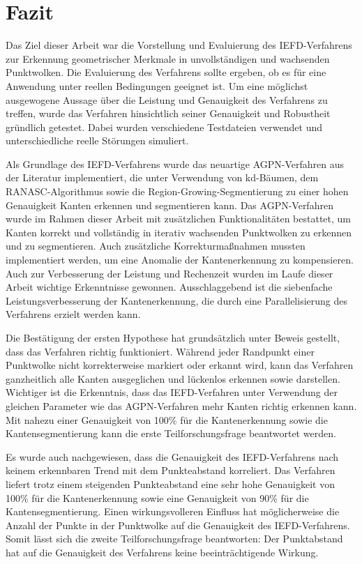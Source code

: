 \chapter{Fazit}

Das Ziel dieser Arbeit war die Vorstellung und Evaluierung des IEFD-Verfahrens zur Erkennung geometrischer Merkmale in unvollständigen und wachsenden Punktwolken. Die Evaluierung des Verfahrens sollte ergeben, ob es für eine Anwendung unter reellen Bedingungen geeignet ist. Um eine möglichst ausgewogene Aussage über die Leistung und Genauigkeit des Verfahrens zu treffen, wurde das Verfahren hinsichtlich seiner Genauigkeit und Robustheit gründlich getestet. Dabei wurden verschiedene Testdateien verwendet und unterschiedliche reelle Störungen simuliert. 

Als Grundlage des IEFD-Verfahrens wurde das neuartige AGPN-Verfahren aus der Literatur implementiert, die unter Verwendung von kd-Bäumen, dem RANASC-Algorithmus sowie die Region-Growing-Segmentierung zu einer hohen Genauigkeit Kanten erkennen und segmentieren kann. Das AGPN-Verfahren wurde im Rahmen dieser Arbeit mit zusätzlichen Funktionalitäten bestattet, um Kanten korrekt und vollständig in iterativ wachsenden Punktwolken zu erkennen und zu segmentieren. Auch zusätzliche Korrekturmaßnahmen mussten implementiert werden, um eine Anomalie der Kantenerkennung zu kompensieren. Auch zur Verbesserung der Leistung und Rechenzeit wurden im Laufe dieser Arbeit wichtige Erkenntnisse gewonnen. Ausschlaggebend ist die siebenfache Leistungsverbesserung der Kantenerkennung, die durch eine Parallelisierung des Verfahrens erzielt werden kann.

Die Bestätigung der ersten Hypothese hat grundsätzlich unter Beweis gestellt, dass das Verfahren richtig funktioniert. Während jeder Randpunkt einer Punktwolke nicht korrekterweise markiert oder erkannt wird, kann das Verfahren ganzheitlich alle Kanten ausgeglichen und lückenlos erkennen sowie darstellen. Wichtiger ist die Erkenntnis, dass das IEFD-Verfahren unter Verwendung der gleichen Parameter wie das AGPN-Verfahren mehr Kanten richtig erkennen kann. Mit nahezu einer Genauigkeit von 100\% für die Kantenerkennung sowie die Kantensegmentierung kann die erste Teilforschungsfrage beantwortet werden. 

Es wurde auch nachgewiesen, dass die Genauigkeit des IEFD-Verfahrens nach keinem erkennbaren Trend mit dem Punkteabstand korreliert. Das Verfahren liefert trotz einem steigenden Punkteabstand eine sehr hohe Genauigkeit von 100\% für die Kantenerkennung sowie eine Genauigkeit von 90\% für die Kantensegmentierung. Einen wirkungsvolleren Einfluss hat möglicherweise die Anzahl der Punkte in der Punktwolke auf die Genauigkeit des IEFD-Verfahrens. Somit lässt sich die zweite Teilforschungsfrage beantworten: Der Punktabstand hat auf die Genauigkeit des Verfahrens keine beeinträchtigende Wirkung. 

